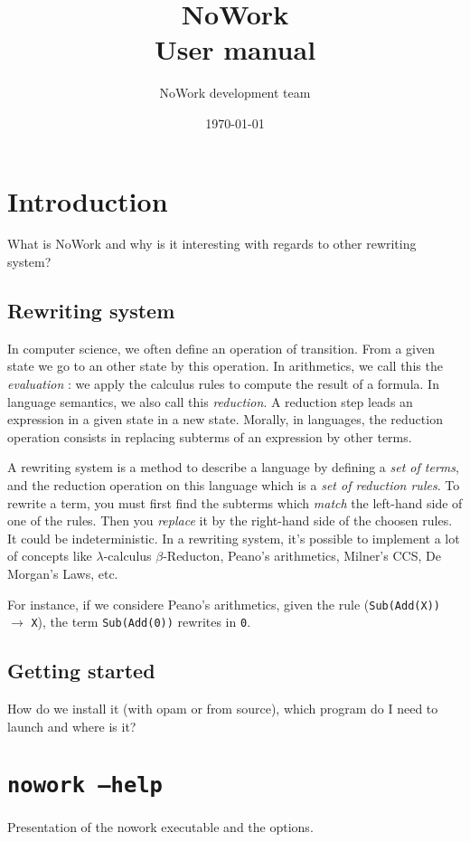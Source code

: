 \documentclass[12pt,a4paper]{article}
\title{NoWork\\
User manual}
\author{NoWork development team\\[2em]}
\date\today
\begin{document}
\maketitle


\section{Introduction}
What is NoWork and why is it interesting with regards to other rewriting system?

\subsection{Rewriting system}
In computer science, we often define an operation of transition. From a
given state we go to an other state by this operation. In arithmetics,
we call this the \emph{evaluation} : we apply the calculus rules to
compute the result of a formula. In language semantics, we also call
this \emph{reduction}. A reduction step leads an expression in a given
state in a new state. Morally, in languages, the reduction operation
consists in replacing subterms of an expression by other terms.

A rewriting system is a method to describe a language by defining a
\emph{set of terms}, and the reduction operation on this language which
is a \emph{set of reduction rules}. 
To rewrite a term, you must first find the subterms which \emph{match} the left-hand side of one of the rules. Then you \emph{replace} it by the right-hand side of the choosen rules. It
could be indeterministic. In a rewriting system, it's possible to implement a lot of concepts like
$\lambda$-calculus $\beta$-Reducton, Peano's arithmetics, Milner's CCS,
De Morgan's Laws, etc. 

  For instance, if we considere Peano's arithmetics, 
  given the rule (\texttt{Sub(Add(X))} $\rightarrow$ \texttt{X}),
  the term \texttt{Sub(Add(0))} rewrites in \texttt{0}.

\subsection{Getting started}
How do we install it (with opam or from source), which program do I need to launch and where is it?

\section{\texttt{nowork --help}}
Presentation of the nowork executable and the options.
\end{document}
